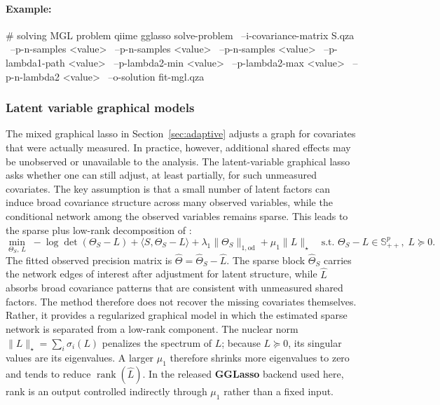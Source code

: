 \documentclass[11pt,a4paper]{article}
\newcommand{\pkg}[1]{\textbf{#1}}
\newcommand{\Sp}{\mathbb{S}}
\DeclareMathOperator{\rank}{rank}
\newcommand{\odnorm}[1]{\lVert #1 \rVert_{1,\mathrm{od}}}
\newcommand{\nucnorm}[1]{\lVert #1 \rVert_{\star}}
\begin{document}
\paragraph{Example:} \mbox{} 
\begin{PseudoCode}
# solving MGL problem
qiime gglasso solve-problem \
    --i-covariance-matrix S.qza \
    --p-n-samples <value> \
    --p-n-samples <value> \
    --p-n-samples <value> \
    --p-lambda1-path <value> \
    --p-lambda2-min <value> \
    --p-lambda2-max <value> \
    --p-n-lambda2 <value> \
    --o-solution fit-mgl.qza
\end{PseudoCode}

\subsubsection{Latent variable graphical models}
\label{sec:slr}

The mixed graphical lasso in Section~\ref{sec:adaptive} adjusts a graph for
covariates that were actually measured. In practice, however, additional shared
effects may be unobserved or unavailable to the analysis. The latent-variable
graphical lasso asks whether one can still adjust, at least partially, for such
unmeasured covariates. The key assumption is that a small number of latent
factors can induce broad covariance structure across many observed variables,
while the conditional network among the observed variables remains sparse. This
leads to the sparse plus low-rank decomposition of
\citet{chandrasekaran2010latent}:
\begin{equation}
\label{eq:slr}
\min_{\Theta_{S},\, L} \;
-\log\det(\Theta_{S} - L) + \langle S, \Theta_{S} - L \rangle
+ \lambda_{1} \odnorm{\Theta_{S}} + \mu_{1} \nucnorm{L}
\quad
\text{s.t. } \Theta_{S}-L\in\Sp^{p}_{++}, \; L\succeq0 .
\end{equation}
The fitted observed precision matrix is
$\widehat{\Theta}=\widehat{\Theta}_{S}-\widehat L$. The sparse block
$\widehat{\Theta}_S$ carries the network edges of interest after adjustment for
latent structure, while $\widehat L$ absorbs broad covariance patterns that are
consistent with unmeasured shared factors. The method therefore does not recover
the missing covariates themselves. Rather, it provides a regularized graphical
model in which the estimated sparse network is separated from a low-rank
component. The nuclear norm $\nucnorm{L}=\sum_i\sigma_i(L)$ penalizes the
spectrum of $L$; because $L\succeq0$, its singular values are its eigenvalues. A
larger $\mu_1$ therefore shrinks more eigenvalues to zero and tends to reduce
$\rank(\widehat L)$. In the released \pkg{GGLasso} backend used here, rank is an
output controlled indirectly through $\mu_1$ rather than a fixed input.
\end{document}
